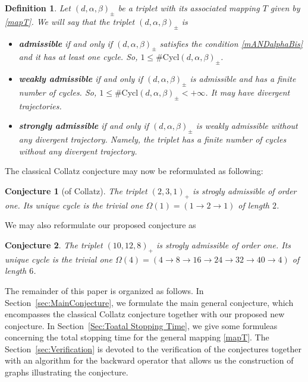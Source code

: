 \documentclass[11pt,a4paper]{article}
\newtheorem{conjecture}{Conjecture}[section]
\newtheorem{definition}{Definition}[section]
\begin{document}
\begin{definition}
	Let $(d,\alpha,\beta)_{\pmb{\pm}}$  be a triplet with its associated  mapping   $T$ given by  \eqref{mapT}.  We will say that the triplet $(d,\alpha,\beta)_{\pmb{\pm}}$  is 
	\begin{itemize}
		\item  \textbf{admissible}   
		if and only if $(d,\alpha,\beta)_{\pmb{\pm}}$
		satisfies the condition  \eqref{mANDalphaBis} and it has at least one cycle. So,  $1\leq \#\mathrm{Cycl} (d,\alpha,\beta)_{\pmb{\pm}}$.
		\item   \textbf{weakly  admissible}   if and only if $(d,\alpha,\beta)_{\pmb{\pm}}$ is admissible and  has a finite number of cycles.  So,  $1\leq \#\mathrm{Cycl} (d,\alpha,\beta)_{\pmb{\pm}}<+\infty$. It may have divergent trajectories.
		\item   \textbf{strongly  admissible}  if and only if $(d,\alpha,\beta)_{\pmb{\pm}}$  is  weakly  admissible   without any divergent trajectory.  Namely, the triplet  has a finite number of   cycles without any divergent trajectory.
	\end{itemize} 
\end{definition}



The classical Collatz conjecture may now be reformulated as following:
\begin{conjecture}[of Collatz]
	The triplet $(2,3,1)_+$ is  strogly admissible  of order one.  Its unique cycle is the trivial one
	$\Omega(1)=(1\rightarrow  2\rightarrow 1)$ of length $2$. 
\end{conjecture}
We may also reformulate our proposed conjecture as 
\begin{conjecture}\label{MyConjecture_2}
	The triplet $(10,12,8)_+$ is  strogly admissible  of order one.  Its unique cycle is the trivial one
	$\Omega(4)=(4\rightarrow  8\rightarrow 16\rightarrow  24\rightarrow 32\rightarrow  40\rightarrow 4)$ of length $6$. 
\end{conjecture}

The remainder of this paper is organized as follows. In Section~\ref{sec:MainConjecture}, we formulate the main general conjecture, which encompasses the classical Collatz conjecture together with our proposed new conjecture.  
In Section~\ref{Sec:Toatal Stopping Time}, we give some formuleas  concerning the total stopping time for the   general mapping \ref{mapT}. The   Section~\ref{sec:Verification} is devoted to the verification of the conjectures together with an
algorithm for the backward operator that allows us the construction of graphs illustrating the conjecture.
\end{document}
